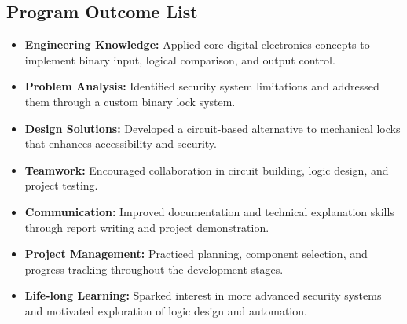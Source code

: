 \subsection{Program Outcome List}
\begin{itemize}
    \item \textbf{Engineering Knowledge:} Applied core digital electronics concepts to implement binary input, logical comparison, and output control.
\item \textbf{Problem Analysis:} Identified security system limitations and addressed them through a custom binary lock system.
\item\textbf{Design Solutions:} Developed a circuit-based alternative to mechanical locks that enhances accessibility and security.
\item \textbf{Teamwork:} Encouraged collaboration in circuit building, logic design, and project testing.
\item \textbf{Communication:} Improved documentation and technical explanation skills through report writing and project demonstration.
\item \textbf{Project Management:} Practiced planning, component selection, and progress tracking throughout the development stages.
\item \textbf{Life-long Learning:} Sparked interest in more advanced security systems and motivated exploration of logic design and automation.
\end{itemize}

